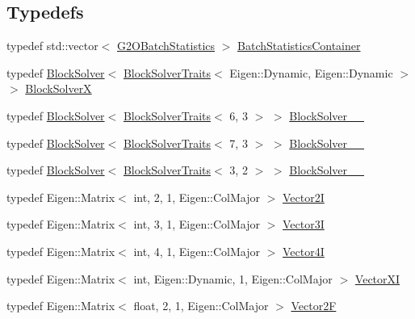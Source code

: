 \subsection*{Typedefs}
\begin{DoxyCompactItemize}
\item 
typedef std\+::vector$<$ \hyperlink{structg2o_1_1G2OBatchStatistics}{G2\+O\+Batch\+Statistics} $>$ \hyperlink{namespaceg2o_a526b32fde21f83173acb2bb29db68275}{Batch\+Statistics\+Container}
\item 
typedef \hyperlink{classg2o_1_1BlockSolver}{Block\+Solver}$<$ \hyperlink{structg2o_1_1BlockSolverTraits}{Block\+Solver\+Traits}$<$ Eigen\+::\+Dynamic, Eigen\+::\+Dynamic $>$ $>$ \hyperlink{namespaceg2o_a8d3214273331c25cbb5d5266770e6c12}{Block\+SolverX}
\item 
typedef \hyperlink{classg2o_1_1BlockSolver}{Block\+Solver}$<$ \hyperlink{structg2o_1_1BlockSolverTraits}{Block\+Solver\+Traits}$<$ 6, 3 $>$ $>$ \hyperlink{namespaceg2o_a6eb2ab4064026e9c63c99b783b892cda}{Block\+Solver\+\_\+\_}
\item 
typedef \hyperlink{classg2o_1_1BlockSolver}{Block\+Solver}$<$ \hyperlink{structg2o_1_1BlockSolverTraits}{Block\+Solver\+Traits}$<$ 7, 3 $>$ $>$ \hyperlink{namespaceg2o_a83b509c02a1333991cbb0c04d3ff7beb}{Block\+Solver\+\_\+\_}
\item 
typedef \hyperlink{classg2o_1_1BlockSolver}{Block\+Solver}$<$ \hyperlink{structg2o_1_1BlockSolverTraits}{Block\+Solver\+Traits}$<$ 3, 2 $>$ $>$ \hyperlink{namespaceg2o_a4e97101bb6ac73bdb6527994a36b9819}{Block\+Solver\+\_\+\_}
\item 
typedef Eigen\+::\+Matrix$<$ int, 2, 1, Eigen\+::\+Col\+Major $>$ \hyperlink{namespaceg2o_affca5cbeca977d670b96298de84c5d2c}{Vector2I}
\item 
typedef Eigen\+::\+Matrix$<$ int, 3, 1, Eigen\+::\+Col\+Major $>$ \hyperlink{namespaceg2o_a501b6f80eef8d521f6fd1a31e8413f3a}{Vector3I}
\item 
typedef Eigen\+::\+Matrix$<$ int, 4, 1, Eigen\+::\+Col\+Major $>$ \hyperlink{namespaceg2o_a7a368c33c15d52cca214b779a5fb32ce}{Vector4I}
\item 
typedef Eigen\+::\+Matrix$<$ int, Eigen\+::\+Dynamic, 1, Eigen\+::\+Col\+Major $>$ \hyperlink{namespaceg2o_a2797ddaf7a7a6dc22843a38d34754e55}{Vector\+XI}
\item 
typedef Eigen\+::\+Matrix$<$ float, 2, 1, Eigen\+::\+Col\+Major $>$ \hyperlink{namespaceg2o_ab48f53e68ad9d381fcad63c4901af2e2}{Vector2F}
\item 

\end{DoxyCompactItemize}
